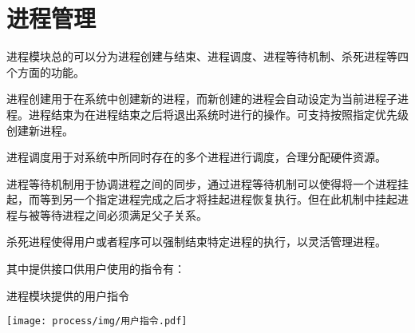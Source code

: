 \section{进程管理}

进程模块总的可以分为进程创建与结束、进程调度、进程等待机制、杀死进程等四个方面的功能。

进程创建用于在系统中创建新的进程，而新创建的进程会自动设定为当前进程子进程。进程结束为在进程结束之后将退出系统时进行的操作。可支持按照指定优先级创建新进程。

进程调度用于对系统中所同时存在的多个进程进行调度，合理分配硬件资源。

进程等待机制用于协调进程之间的同步，通过进程等待机制可以使得将一个进程挂起，而等到另一个指定进程完成之后才将挂起进程恢复执行。但在此机制中挂起进程与被等待进程之间必须满足父子关系。

杀死进程使得用户或者程序可以强制结束特定进程的执行，以灵活管理进程。

其中提供接口供用户使用的指令有：


\begin{table}[H]
  \centering
  \caption{进程模块提供的用户指令}
  \texttt{[image: process/img/用户指令.pdf]}
\end{table}

